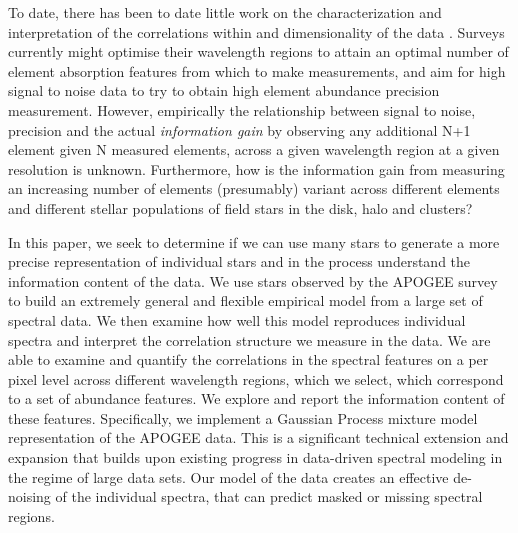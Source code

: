\documentclass[a4paper,fleqn,usenatbib]{mnras}
\begin{document}
To date, there has been to date little work on the characterization and interpretation of the correlations within and dimensionality of the data \citep[see however][]{Ting2012, PJ2019, M2014}. Surveys currently might optimise their wavelength regions to attain an optimal number of element absorption features from which to make measurements, and aim for high signal to noise data to try to obtain high element abundance precision measurement. However, empirically the relationship between signal to noise, precision and the actual \textit{information gain} by observing any additional N+1 element given N measured elements, across a given wavelength region at a given resolution is unknown.  Furthermore, how is the information gain from measuring an increasing number of elements (presumably) variant across different elements and different stellar populations of field stars in the disk, halo and clusters? 

In this paper, we seek to determine if we can use many stars to generate a more precise representation of individual stars and in the process understand the information content of the data. We use stars observed by the APOGEE survey to build an extremely general and flexible empirical model from a large set of spectral data. We then examine how well this model reproduces individual spectra and interpret the correlation structure we measure in the data. We are able to examine and quantify the correlations in the spectral features on a per pixel level across different wavelength regions, which we select, which correspond to a set of abundance features. We explore and report the information content of these features. Specifically, we implement a Gaussian Process mixture model representation of the APOGEE data. This is a significant technical extension and expansion that builds upon existing progress in data-driven spectral modeling in the regime of large data sets. Our model of the data creates an effective de-noising of the individual spectra, that can predict masked or missing spectral regions. 

 
 

\end{document}
